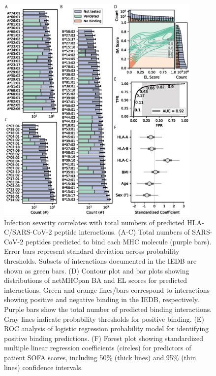 \documentclass[utf8]{frontiersinFPHY_FAMS} %
\begin{document}
\begin{figure}[h!]
\begin{center}
\includegraphics[width=10cm]{Figure1}%
\end{center}
\caption{Infection severity correlates with total numbers of predicted HLA-C/SARS-CoV-2 peptide interactions. (A-C) Total numbers of SARS-CoV-2 peptides predicted to bind each MHC molecule (purple bars). Error bars represent standard deviation across probability thresholds. Subsets of interactions documented in the IEDB are shown as green bars. (D) Contour plot and bar plots showing distributions of netMHCpan BA and EL scores for predicted interactions. Green and orange lines/bars correspond to interactions showing positive and negative binding in the IEDB, respectively. Purple bars show the total number of predicted binding interactions. Gray lines indicate probability thresholds for positive binding. (E) ROC analysis of logistic regression probability model for identifying positive binding predictions. (F) Forest plot showing standardized multiple linear regression coefficients (circles) for predictors of patient SOFA scores, including 50\% (thick lines) and 95\% (thin lines) confidence intervals.}\label{fig:1}
\end{figure}
\end{document}
